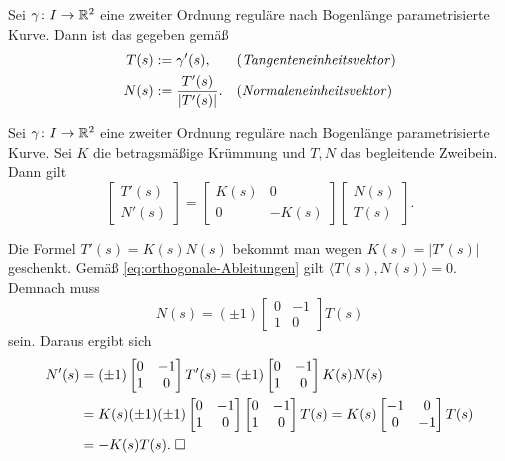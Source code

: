 \begin{definition}
Sei $\gamma\colon I\to\mathbb R^2$ eine zweiter Ordnung reguläre
nach Bogenlänge parametrisierte Kurve. Dann ist das
 gegeben gemäß
\begin{align}
T(s) &:= \gamma'(s), && \text{(\emph{Tangenteneinheitsvektor})}\\
N(s) &:= \frac{T'(s)}{|T'(s)|}. && \text{(\emph{Normaleneinheitsvektor})}
\end{align}
\end{definition}

\begin{theorem}
Sei $\gamma\colon I\to\mathbb R^2$ eine zweiter Ordnung reguläre nach
Bogenlänge parametrisierte Kurve. Sei $K$ die betragsmäßige
Krümmung und $T,N$ das begleitende Zweibein. Dann gilt%
\begin{equation}
\begin{bmatrix}
T'(s)\\ N'(s)
\end{bmatrix}
= \begin{bmatrix}
K(s)  & 0\\
0 & -K(s)
\end{bmatrix}\begin{bmatrix}
N(s)\\ T(s)
\end{bmatrix}.
\end{equation}
\end{theorem}

\noindent{}
Die Formel $T'(s) = K(s)N(s)$ bekommt man wegen $K(s)=|T'(s)|$
geschenkt. Gemäß \eqref{eq:orthogonale-Ableitungen} gilt
$\langle T(s),N(s)\rangle=0$. Demnach muss
\begin{equation}
N(s) = (\pm 1)\begin{bmatrix}0 & -1\\ 1 & 0\end{bmatrix}T(s)
\end{equation}
sein. Daraus ergibt sich
\begin{align}
N'(s) &= (\pm 1)\begin{bmatrix}0 & -1\\ 1 & 0\end{bmatrix}T'(s)
= (\pm 1)\begin{bmatrix}0 & -1\\ 1 & 0\end{bmatrix}K(s)N(s)\\
&= K(s)(\pm 1)(\pm 1)\begin{bmatrix}0 & -1\\ 1 & 0\end{bmatrix}
  \begin{bmatrix}0 & -1\\ 1 & 0\end{bmatrix}T(s)
= K(s)\begin{bmatrix}-1 & 0\\ 0 & -1\end{bmatrix}T(s)\\
&= -K(s)T(s).\;\Box
\end{align}


